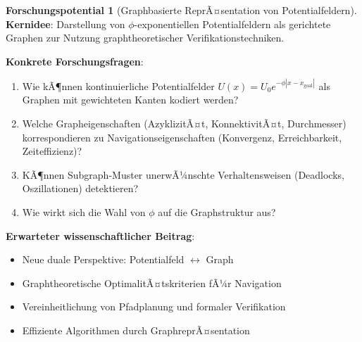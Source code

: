 ﻿\documentclass[a4paper,12pt]{article}
\theoremstyle{definition}
\newtheorem{potential}{Forschungspotential}[section]
\begin{document}
\begin{potential}[Graphbasierte ReprÃ¤sentation von Potentialfeldern]
\textbf{Kernidee}: Darstellung von $\phi$-exponentiellen Potentialfeldern als gerichtete Graphen zur Nutzung graphtheoretischer Verifikationstechniken.

\textbf{Konkrete Forschungsfragen}:
\begin{enumerate}
	\item Wie kÃ¶nnen kontinuierliche Potentialfelder $U(x) = U_0 e^{-\phi |x - x_{\text{goal}}|}$ als Graphen mit gewichteten Kanten kodiert werden?
	\item Welche Grapheigenschaften (AzyklizitÃ¤t, KonnektivitÃ¤t, Durchmesser) korrespondieren zu Navigationseigenschaften (Konvergenz, Erreichbarkeit, Zeiteffizienz)?
	\item KÃ¶nnen Subgraph-Muster unerwÃ¼nschte Verhaltensweisen (Deadlocks, Oszillationen) detektieren?
	\item Wie wirkt sich die Wahl von $\phi$ auf die Graphstruktur aus?
\end{enumerate}

\textbf{Erwarteter wissenschaftlicher Beitrag}:
\begin{itemize}
	\item Neue duale Perspektive: Potentialfeld $\leftrightarrow$ Graph
	\item Graphtheoretische OptimalitÃ¤tskriterien fÃ¼r Navigation
	\item Vereinheitlichung von Pfadplanung und formaler Verifikation
	\item Effiziente Algorithmen durch GraphreprÃ¤sentation
\end{itemize}
\end{potential}
\end{document}
